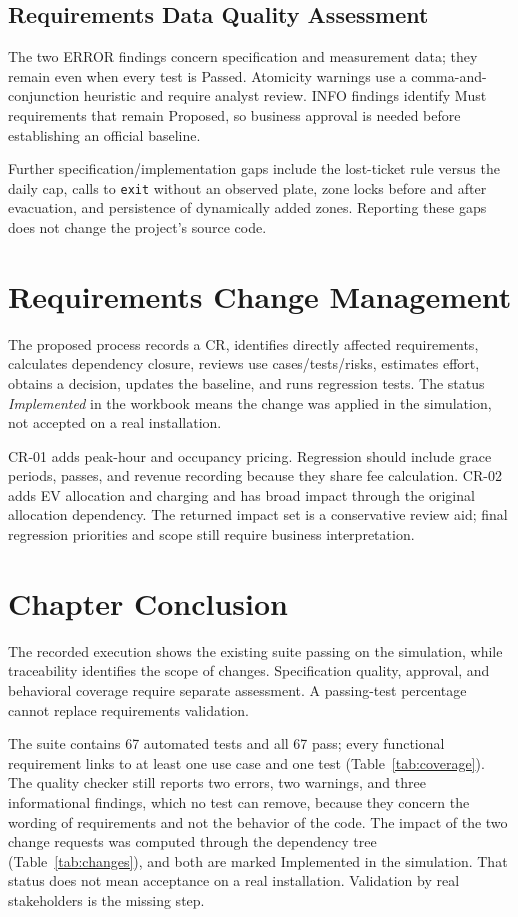 \subsection{Requirements Data Quality Assessment}

The two ERROR findings concern specification and measurement data; they remain even when every test is Passed. Atomicity warnings use a comma-and-conjunction heuristic and require analyst review. INFO findings identify Must requirements that remain Proposed, so business approval is needed before establishing an official baseline.

Further specification/implementation gaps include the lost-ticket rule versus the daily cap, calls to \texttt{exit} without an observed plate, zone locks before and after evacuation, and persistence of dynamically added zones. Reporting these gaps does not change the project's source code.

\section{Requirements Change Management}
The proposed process records a CR, identifies directly affected requirements, calculates dependency closure, reviews use cases/tests/risks, estimates effort, obtains a decision, updates the baseline, and runs regression tests. The status \emph{Implemented} in the workbook means the change was applied in the simulation, not accepted on a real installation.

CR-01 adds peak-hour and occupancy pricing. Regression should include grace periods, passes, and revenue recording because they share fee calculation. CR-02 adds EV allocation and charging and has broad impact through the original allocation dependency. The returned impact set is a conservative review aid; final regression priorities and scope still require business interpretation.

\section{Chapter Conclusion}
The recorded execution shows the existing suite passing on the simulation, while traceability identifies the scope of changes. Specification quality, approval, and behavioral coverage require separate assessment. A passing-test percentage cannot replace requirements validation.

The suite contains 67 automated tests and all 67 pass; every functional requirement links to at least one use case and one test (Table~\ref{tab:coverage}). The quality checker still reports two errors, two warnings, and three informational findings, which no test can remove, because they concern the wording of requirements and not the behavior of the code. The impact of the two change requests was computed through the dependency tree (Table~\ref{tab:changes}), and both are marked Implemented in the simulation. That status does not mean acceptance on a real installation. Validation by real stakeholders is the missing step.
